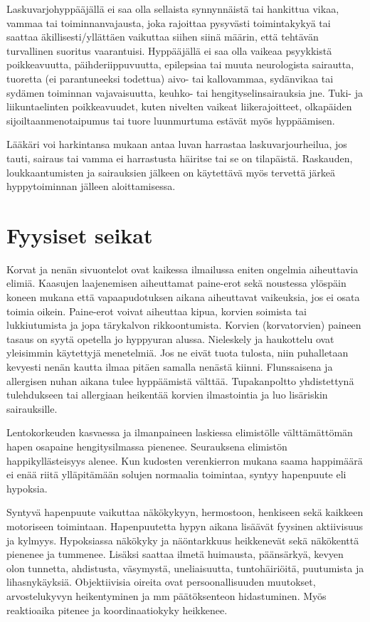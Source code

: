 
Laskuvarjohyppääjällä ei saa olla sellaista synnynnäistä tai hankittua vikaa, vammaa tai toiminnanvajausta, joka rajoittaa pysyvästi toimintakykyä tai saattaa äkillisesti/yllättäen vaikuttaa siihen siinä määrin, että tehtävän turvallinen suoritus vaarantuisi. Hyppääjällä ei saa olla vaikeaa psyykkistä poikkeavuutta, päihderiippuvuutta, epilepsiaa tai muuta neurologista sairautta, tuoretta (ei parantuneeksi todettua) aivo- tai kallovammaa, sydänvikaa tai sydämen toiminnan vajavaisuutta, keuhko- tai hengityselinsairauksia jne. Tuki- ja liikuntaelinten poikkeavuudet, kuten nivelten vaikeat liikerajoitteet, olkapäiden sijoiltaanmenotaipumus tai tuore luunmurtuma estävät myös hyppäämisen. 


Lääkäri voi harkintansa mukaan antaa luvan harrastaa laskuvarjourheilua, jos tauti, sairaus tai vamma ei harrastusta häiritse tai se on tilapäistä. Raskauden, loukkaantumisten ja sairauksien jälkeen on käytettävä myös tervettä järkeä hyppytoiminnan jälleen aloittamisessa.  

\section{ Fyysiset seikat }
\label{fysiologia-fyysiset-seikat}


Korvat ja nenän sivuontelot ovat kaikessa ilmailussa eniten ongelmia aiheuttavia elimiä. Kaasujen laajenemisen aiheuttamat paine-erot sekä noustessa ylöspäin koneen mukana että vapaapudotuksen aikana aiheuttavat vaikeuksia, jos ei osata toimia oikein. Paine-erot voivat aiheuttaa kipua, korvien soimista tai lukkiutumista ja jopa tärykalvon rikkoontumista. Korvien (korvatorvien) paineen tasaus on syytä opetella jo hyppyuran alussa. Nieleskely ja haukottelu ovat yleisimmin käytettyjä menetelmiä. Jos ne eivät tuota tulosta, niin puhalletaan kevyesti nenän kautta ilmaa pitäen samalla nenästä kiinni. Flunssaisena ja allergisen nuhan aikana tulee hyppäämistä välttää. Tupakanpoltto yhdistettynä tulehdukseen tai allergiaan heikentää korvien ilmastointia ja luo lisäriskin sairauksille.  


Lentokorkeuden kasvaessa ja ilmanpaineen laskiessa elimistölle välttämättömän hapen osapaine hengitysilmassa pienenee. Seurauksena elimistön happikyllästeisyys alenee. Kun kudosten verenkierron mukana saama happimäärä ei enää riitä ylläpitämään solujen normaalia toimintaa, syntyy hapenpuute eli hypoksia. 


Syntyvä hapenpuute vaikuttaa näkökykyyn, hermostoon, henkiseen sekä kaikkeen motoriseen toimintaan. Hapenpuutetta hypyn aikana lisäävät fyysinen aktiivisuus ja kylmyys. Hypoksiassa näkökyky ja näöntarkkuus heikkenevät sekä näkökenttä pienenee ja tummenee. Lisäksi saattaa ilmetä huimausta, päänsärkyä, kevyen olon tunnetta, ahdistusta, väsymystä, uneliaisuutta, tuntohäiriöitä, puutumista ja lihasnykäyksiä. Objektiivisia oireita ovat persoonallisuuden muutokset, arvostelukyvyn heikentyminen ja mm päätöksenteon hidastuminen. Myös reaktioaika pitenee ja koordinaatiokyky heikkenee.  


